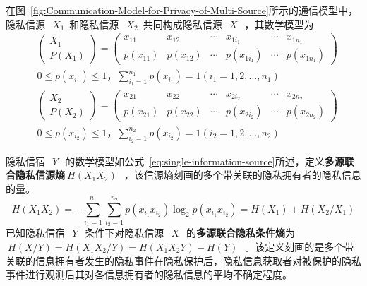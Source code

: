 在图~\ref{fig:Communication-Model-for-Privacy-of-Multi-Source}所示的通信模型中，隐私信源~$~X_{1}$~和隐私信源~$~X_{2}$~共同构成隐私信源~$~X~$~，其数学模型为
\begin{equation}
\label{eq:privacy-source1-probability}
\begin{split}
&\begin{pmatrix}
X_{1}\\ 
P(X_{1})
\end{pmatrix}=\begin{pmatrix}
x_{11} & x_{12} & \cdots  & x_{1i_{1}} & \cdots  & x_{1n_{1}}\\ 
p(x_{11})& p(x_{12}) & \cdots & p(x_{1i_{1}}) & \cdots & p(x_{1n_{1}})
\end{pmatrix} \\
&0\leqslant p(x_{i_{1}})\leqslant 1，\sum_{i_{1}=1}^{n_{1}}p(x_{i_{1}})=1(i_{1}=1,2,...,n_{1})
\end{split}
\end{equation}
\begin{equation}
\label{eq:privacy-source2-probability}
\begin{split}
&\begin{pmatrix}
X_{2}\\ 
P(X_{2})
\end{pmatrix}=\begin{pmatrix}
x_{21} & x_{22} & \cdots  & x_{2i_{2}} & \cdots  & x_{2n_{2}}\\ 
p(x_{21})& p(x_{22}) & \cdots & p(x_{2i_{2}}) & \cdots & p(x_{2n_{2}})
\end{pmatrix} \\
&0\leqslant p(x_{i_{2}})\leqslant 1，\sum_{i_{2}=1}^{n_{2}}p(x_{i_{2}})=1(i_{2}=1,2,...,n_{2})
\end{split}
\end{equation}

隐私信宿~$~Y~$~的数学模型如公式~\ref{eq:single-information-source}所述，定义\textbf{多源联合隐私信源熵}$~H(X_{1}X_{2})~$~，该信源熵刻画的多个带关联的隐私拥有者的隐私信息的量。
\begin{equation}
H(X_{1}X_{2}) = -\sum_{i_{1}=1}^{n_{1}}\sum_{i_{2}=1}^{n_{2}}p(x_{i_{1}}x_{i_{2}})\log_{2}p(x_{i_{1}}x_{i_{2}})=H(X_{1})+H(X_{2}/X_{1})
\end{equation}
已知隐私信宿~$~Y~$~条件下对隐私信源~$~X~$~的\textbf{多源联合隐私条件熵}为~$~H(X/Y)=H(X_{1}X_{2}/Y)=H(X_{1}X_{2}Y)-H(Y)~$~。该定义刻画的是多个带关联的信息拥有者发生的隐私事件在隐私保护后，隐私信息获取者对被保护的隐私事件进行观测后其对各信息拥有者的隐私信息的平均不确定程度。

